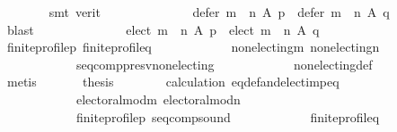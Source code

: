 \begin{isabellebody}
\ \ \ \ \ \ \isamarkupfalse%
\ {\isacharparenleft}{\kern0pt}smt\ {\isacharparenleft}{\kern0pt}verit{\isacharparenright}{\kern0pt}{\isacharparenright}{\kern0pt}\isanewline
\ \ \ \ \isamarkupfalse%
\ \isamarkupfalse%
\ \isanewline
\ \ \ \ \ \ {\isachardoublequoteopen}defer\ {\isacharparenleft}{\kern0pt}m\ {\isasymtriangleright}\ n{\isacharparenright}{\kern0pt}\ A\ p\ {\isacharequal}{\kern0pt}\ defer\ {\isacharparenleft}{\kern0pt}m\ {\isasymtriangleright}\ n{\isacharparenright}{\kern0pt}\ A\ q{\isachardoublequoteclose}\isanewline
\ \ \ \ \ \ \isamarkupfalse%
\ blast\isanewline
\ \ \ \ \isamarkupfalse%
\ \isamarkupfalse%
\ \isanewline
\ \ \ \ \ \ {\isachardoublequoteopen}elect\ {\isacharparenleft}{\kern0pt}m\ {\isasymtriangleright}\ n{\isacharparenright}{\kern0pt}\ A\ p\ {\isacharequal}{\kern0pt}\ elect\ {\isacharparenleft}{\kern0pt}m\ {\isasymtriangleright}\ n{\isacharparenright}{\kern0pt}\ A\ q{\isachardoublequoteclose}\isanewline
\ \ \ \ \ \ \isamarkupfalse%
\ finite{\isacharunderscore}{\kern0pt}profile{\isacharunderscore}{\kern0pt}p\ finite{\isacharunderscore}{\kern0pt}profile{\isacharunderscore}{\kern0pt}q\isanewline
\ \ \ \ \ \ \ \ \ \ \ \ non{\isacharunderscore}{\kern0pt}electing{\isacharunderscore}{\kern0pt}m\ non{\isacharunderscore}{\kern0pt}electing{\isacharunderscore}{\kern0pt}n\isanewline
\ \ \ \ \ \ \ \ \ \ \ \ seq{\isacharunderscore}{\kern0pt}comp{\isacharunderscore}{\kern0pt}presv{\isacharunderscore}{\kern0pt}non{\isacharunderscore}{\kern0pt}electing\isanewline
\ \ \ \ \ \ \ \ \ \ \ \ non{\isacharunderscore}{\kern0pt}electing{\isacharunderscore}{\kern0pt}def\isanewline
\ \ \ \ \ \ \isamarkupfalse%
\ metis\ \isanewline
\ \ \ \ \isamarkupfalse%
\ {\isacharquery}{\kern0pt}thesis\isanewline
\ \ \ \ \ \ \isamarkupfalse%
\ calculation\ eq{\isacharunderscore}{\kern0pt}def{\isacharunderscore}{\kern0pt}and{\isacharunderscore}{\kern0pt}elect{\isacharunderscore}{\kern0pt}imp{\isacharunderscore}{\kern0pt}eq\isanewline
\ \ \ \ \ \ \ \ \ \ \ \ electoral{\isacharunderscore}{\kern0pt}mod{\isacharunderscore}{\kern0pt}m\ electoral{\isacharunderscore}{\kern0pt}mod{\isacharunderscore}{\kern0pt}n\isanewline
\ \ \ \ \ \ \ \ \ \ \ \ finite{\isacharunderscore}{\kern0pt}profile{\isacharunderscore}{\kern0pt}p\ seq{\isacharunderscore}{\kern0pt}comp{\isacharunderscore}{\kern0pt}sound\isanewline
\ \ \ \ \ \ \ \ \ \ \ \ finite{\isacharunderscore}{\kern0pt}profile{\isacharunderscore}{\kern0pt}q\isanewline

\end{isabellebody}
